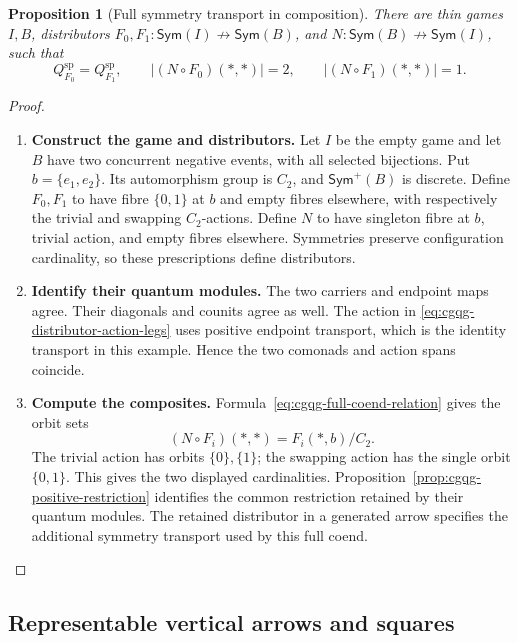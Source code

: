 \documentclass[oneside]{article}
\newcommand{\Sym}{\mathsf{Sym}}
\newcommand{\xnrightarrow}[1]{\mathrel{\overset{#1}{\nrightarrow}}}
\theoremstyle{plain}
\newtheorem{proposition}[theorem]{Proposition}
\theoremstyle{definition}
\theoremstyle{remark}
\begin{document}
\begin{proposition}[Full symmetry transport in composition]
\label{prop:cgqg-full-transport-example}
There are thin games \(I,B\), distributors \(F_0,F_1:\Sym(I)\xnrightarrow{}\Sym(B)\),
and \(N:\Sym(B)\xnrightarrow{}\Sym(I)\), such that
\[
 Q_{F_0}^{\mathrm{sp}}=Q_{F_1}^{\mathrm{sp}},
 \qquad
 |(N\circ F_0)(*,*)|=2,\qquad |(N\circ F_1)(*,*)|=1.
\]
\end{proposition}
\begin{proof}
    \leavevmode
    \begin{enumerate}[beginpenalty=10000]
        \item \textbf{Construct the game and distributors.}
        Let \(I\) be the empty game and let \(B\) have two concurrent
        negative events, with all selected bijections. Put
        \(b=\{e_1,e_2\}\). Its automorphism group is \(C_2\), and
        \(\Sym^+(B)\) is discrete. Define \(F_0,F_1\) to have fibre
        \(\{0,1\}\) at \(b\) and empty fibres elsewhere, with respectively
        the trivial and swapping \(C_2\)-actions. Define \(N\) to have
        singleton fibre at \(b\), trivial action, and empty fibres
        elsewhere. Symmetries preserve configuration cardinality, so
        these prescriptions define distributors.

        \item \textbf{Identify their quantum modules.}
        The two carriers and endpoint maps agree. Their diagonals
        and counits agree as well. The action in
        \eqref{eq:cgqg-distributor-action-legs} uses positive endpoint
        transport, which is the identity transport in this example.
        Hence the two comonads and action spans coincide.

        \item \textbf{Compute the composites.}
        Formula~\eqref{eq:cgqg-full-coend-relation} gives the orbit sets
        \[
        (N\circ F_i)(*,*)=F_i(*,b)/C_2.
        \]
        The trivial action has orbits \(\{0\},\{1\}\); the swapping
        action has the single orbit \(\{0,1\}\). This gives the two
        displayed cardinalities. Proposition~\ref{prop:cgqg-positive-restriction}
        identifies the common restriction retained by their quantum
        modules. The retained distributor in a generated arrow specifies
        the additional symmetry transport used by this full coend. \qedhere
    \end{enumerate}
\end{proof}

\subsection{Representable vertical arrows and squares}
\label{subsec:cgqg-representable-quantum-maps}
\end{document}
